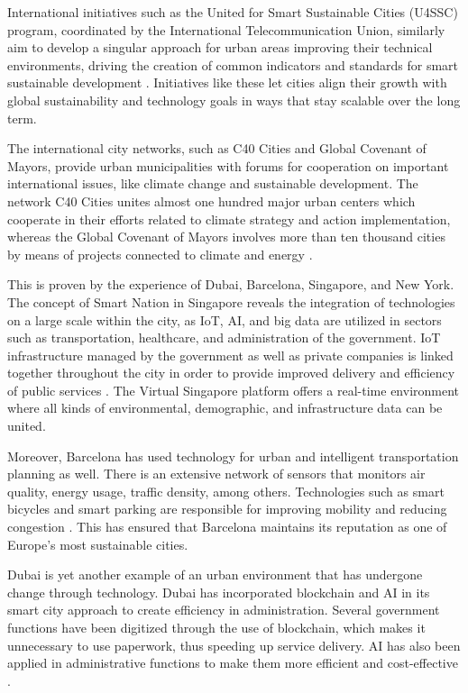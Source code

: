 \documentclass[pdflatex,sn-mathphys-num]{sn-jnl}%
\theoremstyle{thmstyleone}%
\theoremstyle{thmstyletwo}%
\theoremstyle{thmstylethree}%
\begin{document}
International initiatives such as the United for Smart Sustainable Cities (U4SSC) program, coordinated by the International Telecommunication Union, similarly aim to develop a singular approach for urban areas improving their technical environments, driving the creation of common indicators and standards for smart sustainable development \cite{r83,r85}. Initiatives like these let cities align their growth with global sustainability and technology goals in ways that stay scalable over the long term.

The international city networks, such as C40 Cities and Global Covenant of Mayors, provide urban municipalities with forums for cooperation on important international issues, like climate change and sustainable development. The network C40 Cities unites almost one hundred major urban centers which cooperate in their efforts related to climate strategy and action implementation, whereas the Global Covenant of Mayors involves more than ten thousand cities by means of projects connected to climate and energy \cite{r86,r109}.

This is proven by the experience of Dubai, Barcelona, Singapore, and New York. The concept of Smart Nation in Singapore reveals the integration of technologies on a large scale within the city, as IoT, AI, and big data are utilized in sectors such as transportation, healthcare, and administration of the government. IoT infrastructure managed by the government as well as private companies is linked together throughout the city in order to provide improved delivery and efficiency of public services \cite{r87,r110}. The Virtual Singapore platform offers a real-time environment where all kinds of environmental, demographic, and infrastructure data can be united.

Moreover, Barcelona has used technology for urban and intelligent transportation planning as well. There is an extensive network of sensors that monitors air quality, energy usage, traffic density, among others. Technologies such as smart bicycles and smart parking are responsible for improving mobility and reducing congestion \cite{r88,r111,r35}. This has ensured that Barcelona maintains its reputation as one of Europe’s most sustainable cities.

Dubai is yet another example of an urban environment that has undergone change through technology. Dubai has incorporated blockchain and AI in its smart city approach to create efficiency in administration. Several government functions have been digitized through the use of blockchain, which makes it unnecessary to use paperwork, thus speeding up service delivery. AI has also been applied in administrative functions to make them more efficient and cost-effective \cite{r89,r112}.
\end{document}
